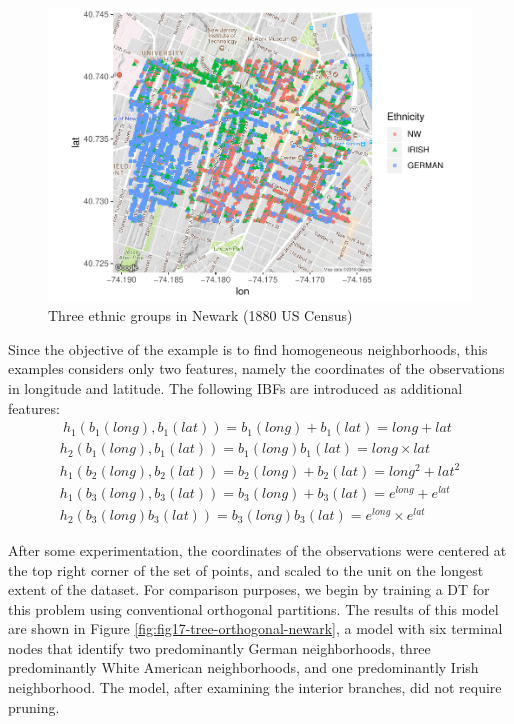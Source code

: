 \documentclass[]{elsarticle} %
\makeatletter
\def\maxwidth{\ifdim\Gin@nat@width>\linewidth\linewidth
\else\Gin@nat@width\fi}
\let\Oldincludegraphics\includegraphics
\renewcommand{\includegraphics}[1]{\Oldincludegraphics[width=\maxwidth]{#1}}
\makeatother
\begin{document}
\begin{figure}
\centering
\includegraphics{Trees_with_Base_Functions_v3_files/figure-latex/fig16-map-newark-1.pdf}
\caption{\label{fig:fig16-map-newark}Three ethnic groups in Newark (1880
US Census)}
\end{figure}

Since the objective of the example is to find homogeneous neighborhoods,
this examples considers only two features, namely the coordinates of the
observations in longitude and latitude. The following IBFs are
introduced as additional features: \[
\begin{array}{c}\
h_1(b_1(long),b_1(lat))=b_1(long)+b_1(lat)=long+lat\\
h_2(b_1(long),b_1(lat))=b_1(long)b_1(lat)=long\times lat\\
h_1(b_2(long),b_2(lat))=b_2(long)+b_2(lat)=long^2+lat^2\\
h_1(b_3(long),b_3(lat))=b_3(long)+b_3(lat)=e^{long}+e^{lat}\\
h_2(b_3(long)b_3(lat))=b_3(long)b_3(lat)=e^{long}\times e^{lat}
\end{array}
\]

After some experimentation, the coordinates of the observations were
centered at the top right corner of the set of points, and scaled to the
unit on the longest extent of the dataset. For comparison purposes, we
begin by training a DT for this problem using conventional orthogonal
partitions. The results of this model are shown in Figure
\ref{fig:fig17-tree-orthogonal-newark}, a model with six terminal nodes
that identify two predominantly German neighborhoods, three
predominantly White American neighborhoods, and one predominantly Irish
neighborhood. The model, after examining the interior branches, did not
require pruning.
\end{document}
